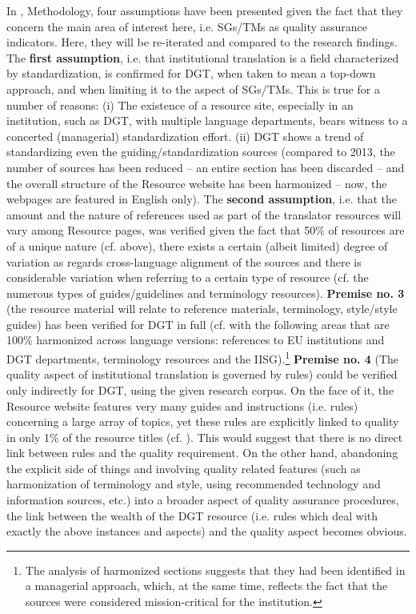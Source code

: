 \documentclass[output=paper]{langsci/langscibook}
\begin{document}
In , Methodology, four assumptions have been presented given the fact that they concern the main area of interest here, i.e. SGs/TMs as quality assurance indicators. Here, they will be re-iterated and compared to the research findings. The \textbf{first assumption}, i.e. that institutional translation is a field characterized by standardization, is confirmed for DGT, when taken to mean a top-down approach, and when limiting it to the aspect of SGs/TMs. This is true for a number of reasons: (i) The existence of a resource site, especially in an institution, such as DGT, with multiple language departments, bears witness to a concerted (managerial) standardization effort. (ii) DGT shows a trend of standardizing even the guiding/standardization sources (compared to 2013, the number of sources has been reduced – an entire section has been discarded – and the overall structure of the Resource website has been harmonized – now, the webpages are featured in English only). The \textbf{second assumption}, i.e. that the amount and the nature of references used as part of the translator resources will vary among Resource pages, was verified given the fact that 50\% of resources are of a unique nature (cf.  above), there exists a certain (albeit limited) degree of variation as regards cross-language alignment of the sources and there is considerable variation when referring to a certain type of resource (cf. the numerous types of guides/guidelines and terminology resources). \textbf{Premise no. 3} (the resource material will relate to reference materials, terminology, style/style guides) has been verified for DGT in full (cf.  with the following areas that are 100\% harmonized across language versions: references to EU institutions and DGT departments, terminology resources and the IISG).\footnote{The analysis of harmonized sections suggests that they had been identified in a managerial approach, which, at the same time, reflects the fact that the sources were considered mission-critical for the institution.} \textbf{Premise no. 4} (The quality aspect of institutional translation is governed by rules) could be verified only indirectly for DGT, using the given research corpus. On the face of it, the Resource website features very many guides and instructions (i.e. rules) concerning a large array of topics, yet these rules are explicitly linked to quality in only 1\% of the resource titles (cf. ). This would suggest that there is no direct link between rules and the quality requirement. On the other hand, abandoning the explicit side of things and involving quality related features (such as harmonization of terminology and style, using recommended technology and information sources, etc.) into a broader aspect of quality assurance procedures, the link between the wealth of the DGT resource (i.e. rules which deal with exactly the above instances and aspects) and the quality aspect becomes obvious.
\end{document}
